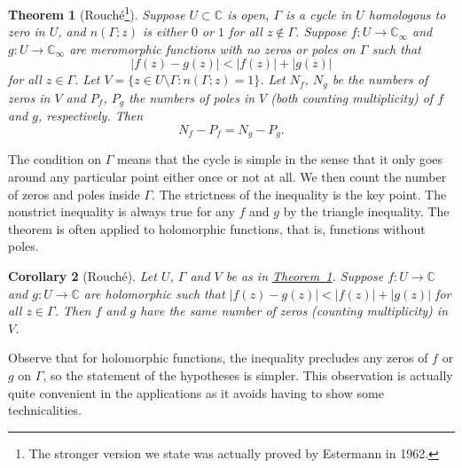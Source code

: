 \documentclass[12pt,openany]{book}
\newcommand{\sabs}[1]{\lvert {#1} \rvert}
\newcommand{\C}{{\mathbb{C}}}
\theoremstyle{plain}
\newtheorem{thm}{Theorem}[section]
\newtheorem{cor}[thm]{Corollary}
\theoremstyle{remark}
\theoremstyle{definition}
\theoremstyle{exercise}
\theoremstyle{example}
\newcommand{\thmref}[1]{\hyperref[#1]{Theorem~\ref*{#1}}}
\begin{document}
\begin{thm}[Rouch\'e\footnote{%
The stronger version we state was actually proved by Estermann in 1962.}]\label{thm:rouche}
\pagebreak[2]
Suppose $U \subset \C$ is open, $\Gamma$ is a cycle
in $U$ homologous to zero in $U$,
and $n(\Gamma;z)$ is either $0$ or $1$ for all $z \notin \Gamma$.
Suppose $f \colon U \to \C_\infty$ and $g \colon U \to \C_\infty$
are meromorphic functions with no zeros or poles on
$\Gamma$ such that
\begin{equation*}
\sabs{f(z)-g(z)} < \sabs{f(z)}+\sabs{g(z)}
\end{equation*}
for all $z \in \Gamma$.
Let $V = \bigl\{ z \in U \setminus \Gamma : n(\Gamma;z) = 1 \bigr\}$.
Let $N_f$, $N_g$ be the numbers of zeros in $V$
and $P_f$, $P_g$ the numbers of poles in $V$ (both counting multiplicity)
of $f$ and $g$, respectively.
Then
\begin{equation*}
N_f - P_f = 
N_g - P_g.
\end{equation*}
\end{thm}

The condition on $\Gamma$ means that the
cycle is simple in the sense
that it only goes around any particular point either once or not at all.
We then count the number of zeros and poles inside $\Gamma$.
The strictness of the inequality is the key point.
The nonstrict inequality is always true for any $f$ and $g$ by the triangle
inequality.
The theorem is often applied to holomorphic functions, that is,
functions without poles.

\begin{cor}[Rouch\'e]\label{thm:rouche2}
Let $U$, $\Gamma$ and $V$ be as in \thmref{thm:rouche}.
Suppose $f \colon U \to \C$ and $g \colon U \to \C$
are holomorphic such that
$\sabs{f(z)-g(z)} < \sabs{f(z)}+\sabs{g(z)}$
for all $z \in \Gamma$.  Then $f$ and $g$ have the same number of zeros
(counting multiplicity) in $V$.
\end{cor}

Observe that for holomorphic functions,
the inequality precludes any zeros of $f$ or
$g$ on $\Gamma$, so the statement of the hypotheses is simpler.
This observation is actually quite convenient in the
applications as it avoids having to show some technicalities.
\end{document}
